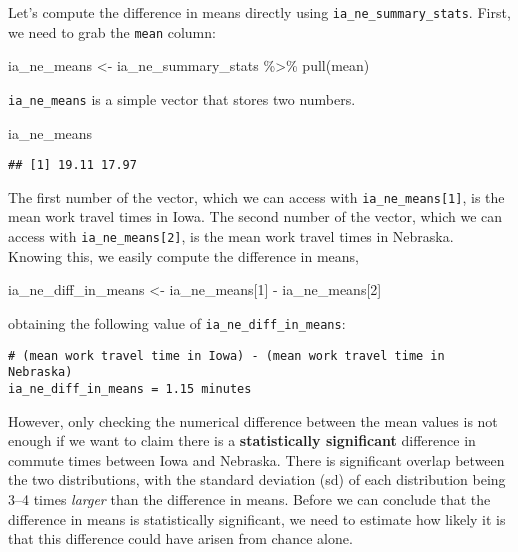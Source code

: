 \documentclass[
]{book}
\newenvironment{Shaded}{\begin{snugshade}}{\end{snugshade}}
\newcommand{\DecValTok}[1]{\textcolor[rgb]{0.00,0.00,0.81}{#1}}
\newcommand{\FunctionTok}[1]{\textcolor[rgb]{0.00,0.00,0.00}{#1}}
\newcommand{\NormalTok}[1]{#1}
\newcommand{\OtherTok}[1]{\textcolor[rgb]{0.56,0.35,0.01}{#1}}
\newcommand{\SpecialCharTok}[1]{\textcolor[rgb]{0.00,0.00,0.00}{#1}}
\begin{document}
Let's compute the difference in means directly using \texttt{ia\_ne\_summary\_stats}.
First, we need to grab the \texttt{mean} column:

\begin{Shaded}
\begin{Highlighting}[]
\NormalTok{ia\_ne\_means }\OtherTok{\textless{}{-}}\NormalTok{ ia\_ne\_summary\_stats }\SpecialCharTok{\%\textgreater{}\%}
  \FunctionTok{pull}\NormalTok{(mean)}
\end{Highlighting}
\end{Shaded}

\texttt{ia\_ne\_means} is a simple vector that stores two numbers.

\begin{Shaded}
\begin{Highlighting}[]
\NormalTok{ia\_ne\_means}
\end{Highlighting}
\end{Shaded}

\begin{verbatim}
## [1] 19.11 17.97
\end{verbatim}

The first number of the vector, which we can access with \texttt{ia\_ne\_means{[}1{]}}, is the mean work travel times in Iowa.
The second number of the vector, which we can access with \texttt{ia\_ne\_means{[}2{]}}, is the mean work travel times in Nebraska.
Knowing this, we easily compute the difference in means,

\begin{Shaded}
\begin{Highlighting}[]
\NormalTok{ia\_ne\_diff\_in\_means }\OtherTok{\textless{}{-}}\NormalTok{ ia\_ne\_means[}\DecValTok{1}\NormalTok{] }\SpecialCharTok{{-}}\NormalTok{ ia\_ne\_means[}\DecValTok{2}\NormalTok{]}
\end{Highlighting}
\end{Shaded}

obtaining the following value of \texttt{ia\_ne\_diff\_in\_means}:

\begin{verbatim}
# (mean work travel time in Iowa) - (mean work travel time in Nebraska)
ia_ne_diff_in_means = 1.15 minutes
\end{verbatim}

However, only checking the numerical difference between the mean values is not enough if we want to claim there is a \textbf{statistically significant} difference in commute times between Iowa and Nebraska.
There is significant overlap between the two distributions, with the standard deviation (sd) of each distribution being 3--4 times \emph{larger} than the difference in means.
Before we can conclude that the difference in means is statistically significant, we need to estimate how likely it is that this difference could have arisen from chance alone.
\end{document}
